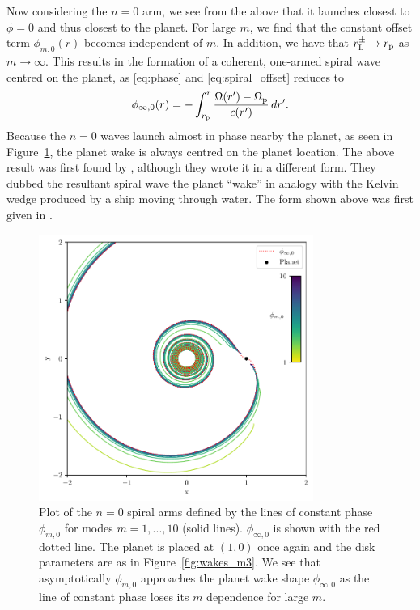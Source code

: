 Now considering the $n=0$ arm, we see from the above that it launches closest to $\phi=0$ and thus closest to the planet.
For large $m$, we find that the constant offset term $\phi_{m,0}(r)$ becomes independent of $m$.
In addition, we have that $r_{\rm L}^\pm \rightarrow r_{\rm p}$ as $m \rightarrow \infty$.
This results in the formation of a coherent, one-armed spiral wave centred on the planet, as \eqref{eq:phase} and \eqref{eq:spiral_offset} reduces to
\begin{align}
    \phi_{\infty,0}(r) = - \int_{r_{\rm p}}^ r \frac{\Omega(r') - \Omega_{\rm p}}{c(r')} \, dr'. \label{eq:planet_wake}
\end{align}
Because the $n=0$ waves launch almost in phase nearby the planet, as seen in Figure~\ref{fig:planet_wake}, the planet wake is always centred on the planet location. 
The above result was first found by \citet{ogilvie2002}, although they wrote it in a different form. 
They dubbed the resultant spiral wave the planet ``wake'' in analogy with the Kelvin wedge produced by a ship moving through water.
The form shown above was first given in \citet{rafikov2002a}.

\begin{figure}
    \centering
    \includegraphics[width = 0.8\textwidth]{figures/planet_wake_shape.pdf}
    \caption{Plot of the $n=0$ spiral arms defined by the lines of constant phase $\phi_{m,0}$ for modes $m=1,...,10$ (solid lines).
    $\phi_{\infty,0}$ is shown with the red dotted line.
    The planet is placed at $(1,0)$ once again and the disk parameters are as in Figure~\ref{fig:wakes_m3}.
    We see that asymptotically $\phi_{m,0}$ approaches the planet wake shape $\phi_{\infty,0}$ as the line of constant phase loses its $m$ dependence for large $m$.}
    \label{fig:planet_wake}
\end{figure}

